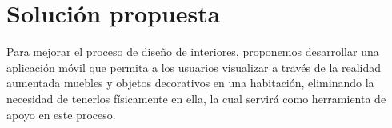 \section{Solución propuesta}
Para mejorar el proceso de diseño de interiores, proponemos desarrollar una aplicación móvil que permita a los usuarios visualizar a través de la realidad aumentada muebles y objetos decorativos en una habitación, eliminando la necesidad de tenerlos físicamente en ella, la cual servirá como herramienta de apoyo en este proceso.

 